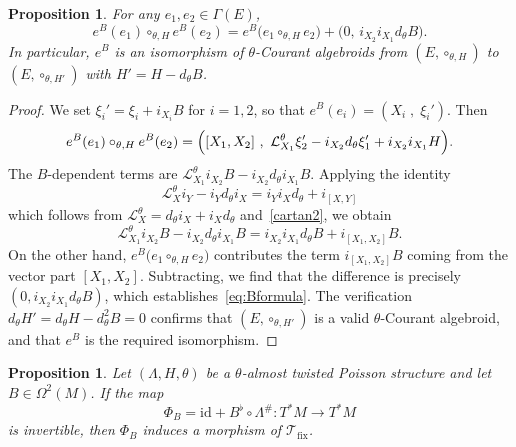 \documentclass[11pt,a4paper]{article}
\theoremstyle{plain}
\newtheorem{proposition}[theorem]{Proposition}
\theoremstyle{definition}
\theoremstyle{remark}
\begin{document}
\begin{proposition}\label{prop:Bgauge}
For any $e_1,e_2\in\Gamma(E)$,
\begin{equation}\label{eq:Bformula}
  e^B(e_1)\circ_{\theta,H} e^B(e_2)
  = e^B\bigl(e_1\circ_{\theta,H} e_2\bigr)
    + \bigl(0,\,i_{X_2}i_{X_1}d_{\theta} B\bigr).
\end{equation}
In particular, $e^B$ is an isomorphism of $\theta$-Courant algebroids from
$(E,\circ_{\theta,H})$ to $(E,\circ_{\theta,H'})$ with $H' = H - d_{\theta} B$.
\end{proposition}

\begin{proof}
We set $\xi_i'=\xi_i+i_{X_i}B$ for $i=1,2$, so that $e^{B}(e_i)=(X_i\;,\;\xi_i')$. Then
$$
  e^B(e_1)\circ_{\theta,H}e^B(e_2)
  = \Bigl([X_1,X_2]\  ,\   \mathcal{L}^\theta_{X_1}\xi'_2 - i_{X_2}d_{\theta}\xi'_1 + i_{X_2}i_{X_1}H\Bigl).
$$
The $B$-dependent terms are $\mathcal{L}^\theta_{X_1}i_{X_2}B - i_{X_2}d_{\theta} i_{X_1}B$.
Applying the identity
$$
  \mathcal{L}^\theta_X i_Y - i_Yd_{\theta} i_X = i_Yi_Xd_{\theta} + i_{[X,Y]}
$$
which follows from $\mathcal{L}^\theta_X=d_{\theta} i_X+i_Xd_{\theta}$ and~\eqref{cartan2}, we obtain
$$
  \mathcal{L}^\theta_{X_1}i_{X_2}B - i_{X_2}d_{\theta} i_{X_1}B
  = i_{X_2}i_{X_1}d_{\theta} B + i_{[X_1,X_2]}B.
$$
On the other hand, $e^{B}\bigl(e_{1}\circ_{\theta,H} e_{2}\bigr)$ contributes the term
$i_{[X_1,X_2]}B$ coming from the vector part $[X_1,X_2]$. Subtracting, we find that
the difference is precisely $(0,i_{X_2}i_{X_1}d_{\theta}B)$, which establishes~\eqref{eq:Bformula}.
The verification $d_{\theta}H' = d_{\theta}H -d_{\theta}^{2}B = 0$  confirms that
$(E,\circ_{\theta,H'})$ is a valid $\theta$-Courant algebroid, and that $e^{B}$ is the
required isomorphism.
\end{proof}

\begin{proposition}\label{prop:preserve}
Let $(\Lambda,H,\theta)$ be a $\theta$-almost twisted Poisson structure and let
$B\in\Omega^{2}(M)$. If the map
$$
\Phi_{B}=\mathrm{id}+B^\flat\circ\Lambda^\#
\colon T^*M\longrightarrow T^*M
$$
is invertible, then $\Phi_{B}$  induces  a morphism of $\mathcal{T}_{\mathrm{fix}}$.
\end{proposition}
\end{document}

